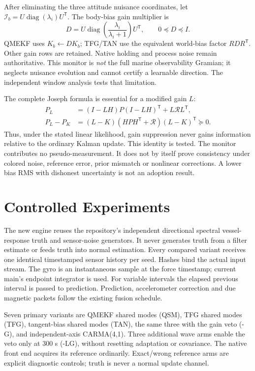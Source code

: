 \documentclass[conference]{IEEEtran}
\newcommand{\tr}{^{\mathsf T}}
\begin{document}
After eliminating the three attitude nuisance coordinates, let
$\mathcal I_b=U\operatorname{diag}(\lambda_i)U\tr$. The body-bias gain
multiplier is
\begin{equation}
 D=U\operatorname{diag}\!\left(\frac{\lambda_i}{\lambda_i+1}\right)U\tr,
 \qquad 0\preceq D\preceq I.
\end{equation}
QMEKF uses $K_b\leftarrow DK_b$; TFG/TAN use the equivalent world-bias
factor $RDR\tr$. Other gain rows are retained. Native holding and process
noise remain authoritative. This monitor is \emph{not} the full marine
observability Gramian; it neglects nuisance evolution and cannot certify a
learnable direction. The independent window analysis tests that limitation.

The complete Joseph formula is essential for a modified gain $L$:
\begin{align}
 P_L&=(I-LH)P(I-LH)\tr+L\mathcal R L\tr,\\
 P_L-P_K&=(L-K)(HPH\tr+\mathcal R)(L-K)\tr\succeq0.
\end{align}
Thus, under the stated linear likelihood, gain suppression never gains
information relative to the ordinary Kalman update. This identity is
tested. The monitor contributes no pseudo-measurement. It does not by itself
prove consistency under colored noise, reference error, prior mismatch or
nonlinear corrections. A lower bias RMS with dishonest uncertainty is not
an adoption result.

\section{Controlled Experiments}
The new engine reuses the repository's independent directional spectral
vessel-response truth and sensor-noise generators. It never generates
truth from a filter estimate or feeds truth into normal estimation.
Every compared variant receives one identical timestamped sensor history
per seed. Hashes bind the actual input stream. The gyro is an instantaneous
sample at the force timestamp; current main's endpoint integrator is used.
For variable intervals the elapsed previous interval is passed to prediction.
Prediction, accelerometer correction and due magnetic packets follow the
existing fusion schedule.

Seven primary variants are QMEKF shared modes (QSM), TFG shared modes (TFG),
tangent-bias shared modes (TAN), the same three with the gain veto (-G), and
independent-axis CARMA(4,1). Three additional wave arms enable the veto only
at 300 s (-LG), without resetting adaptation or covariance. The native
front end acquires its reference ordinarily. Exact/wrong reference arms are
explicit diagnostic controls; truth is never a normal update channel.
\end{document}
